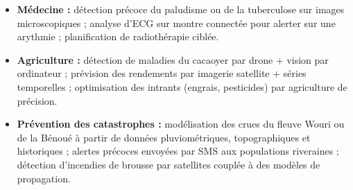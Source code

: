 \documentclass[11pt]{article}
\begin{document}
\begin{itemize}
    \item \textbf{Médecine :} détection précoce du paludisme ou de la tuberculose sur images microscopiques ; analyse d'ECG sur montre connectée pour alerter sur une arythmie ; planification de radiothérapie ciblée.
    \item \textbf{Agriculture :} détection de maladies du cacaoyer par drone + vision par ordinateur ; prévision des rendements par imagerie satellite + séries temporelles ; optimisation des intrants (engrais, pesticides) par agriculture de précision.
    \item \textbf{Prévention des catastrophes :} modélisation des crues du fleuve Wouri ou de la Bénoué à partir de données pluviométriques, topographiques et historiques ; alertes précoces envoyées par SMS aux populations riveraines ; détection d'incendies de brousse par satellites couplée à des modèles de propagation.
\end{itemize}
\end{document}
